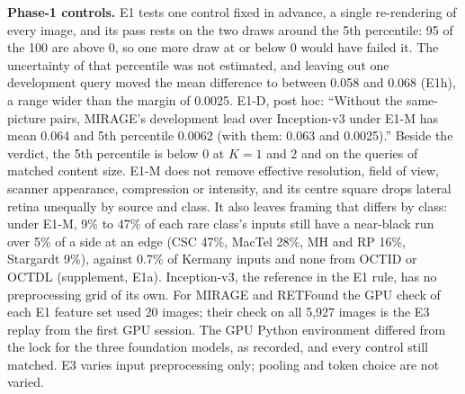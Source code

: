 \documentclass[conference]{IEEEtran}
\begin{document}
\textbf{Phase-1 controls.} E1 tests one control fixed in advance, a single re-rendering of every image, and its pass rests on the two draws around the 5th percentile: 95 of the 100 are above 0, so one more draw at or below 0 would have failed it. The uncertainty of that percentile was not estimated, and leaving out one development query moved the mean difference to between 0.058 and 0.068 (E1h), a range wider than the margin of 0.0025. E1-D, post hoc: ``Without the same-picture pairs, MIRAGE's development lead over Inception-v3 under E1-M has mean 0.064 and 5th percentile 0.0062 (with them: 0.063 and 0.0025).'' Beside the verdict, the 5th percentile is below 0 at $K=1$ and 2 and on the queries of matched content size. E1-M does not remove effective resolution, field of view, scanner appearance, compression or intensity, and its centre square drops lateral retina unequally by source and class. It also leaves framing that differs by class: under E1-M, 9\% to 47\% of each rare class's inputs still have a near-black run over 5\% of a side at an edge (CSC 47\%, MacTel 28\%, MH and RP 16\%, Stargardt 9\%), against 0.7\% of Kermany inputs and none from OCTID or OCTDL (supplement, E1a). Inception-v3, the reference in the E1 rule, has no preprocessing grid of its own. For MIRAGE and RETFound the GPU check of each E1 feature set used 20 images; their check on all 5,927 images is the E3 replay from the first GPU session. The GPU Python environment differed from the lock for the three foundation models, as recorded, and every control still matched. E3 varies input preprocessing only; pooling and token choice are not varied.
\end{document}
